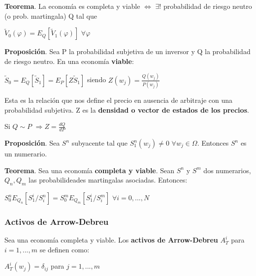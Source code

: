 \documentclass[
10pt, %
a4paper, %
oneside, %
headinclude,footinclude, %
BCOR5mm, %
]{scrartcl}
\newcommand{\n}[1]{\textbf{#1}}
\newcommand{\sub}[1]{_{#1}}
\newcommand{\pot}[1]{^{#1}}
\newcommand{\f}[1]{{\large{${#1}$}}}
\newcommand{\sii}[0]{\Leftrightarrow}
\newcommand{\ent}[0]{\Rightarrow}
\newcounter{ex}
\begin{document}
			\vspace{0.3cm}
			\begin{framed}
			\n{Teorema}. La economía es completa y viable \f{\sii} \f{\exists !} probabilidad de riesgo neutro (o prob. martingala) Q tal que \begin{center} \f{\tilde{V}\sub{0}(\varphi) = E\sub{Q}[\tilde{V}\sub{1}(\varphi)]} \f{\forall \varphi} \end{center}
			\end{framed}
			\vspace{0.3cm}

			\n{Proposición}. Sea P la probabilidad subjetiva de un inversor y Q la probabilidad de riesgo neutro. En una economía \n{viable}: 
			\begin{center} \f{\tilde{S}\sub{0} = E\sub{Q}[\tilde{S}\sub{1}] = E\sub{P}[Z\tilde{S}\sub{1}]} siendo \f{Z(w\sub{j}) = \frac{Q(w\sub{j})}{P(w\sub{j})}} \end{center}

			Esta es la relación que nos define el precio en ausencia de arbitraje con una probabilidad subjetiva. Z es la \n{densidad o vector de estados de los precios}.

			\begin{center} Si \f{Q \sim P} \f{\ent Z = \frac{dQ}{dP}} \end{center}

			\n{Proposición}. Sea \f{S\pot{n}} subyacente tal que \f{S\sub{1}\pot{n}(w\sub{j}) \neq 0} \f{\forall w\sub{j}\in \Omega}. Entonces \f{S\pot{n}} es un numerario.

			\n{Teorema}. Sea una economía \n{completa y viable}. Sean \f{S\pot{n}} y \f{S\pot{m}} dos numerarios, \f{Q\sub{n},Q\sub{m}} las probabilideades martingalas asociadas. Entonces:
			\begin{center} \f{S\sub{0}\pot{n} E\sub{Q\sub{n}}[S\sub{1}\pot{i}/S\sub{i}\pot{n}] = S\sub{0}\pot{m} E\sub{Q\sub{m}}[S\sub{1}\pot{i}/S\sub{i}\pot{m}]} \f{\forall i = 0,...,N} \end{center}

		\subsubsection{Activos de Arrow-Debreu}

			Sea una economía completa y viable. Los \n{activos de Arrow-Debreu} \f{A\sub{T}\pot{i}} para \f{i = 1,...,m} se definen como: 
			\begin{center} \f{A\sub{T}\pot{i}(w\sub{j}) = \delta\sub{ij}} para \f{j = 1,...,m} \end{center}
\end{document}
